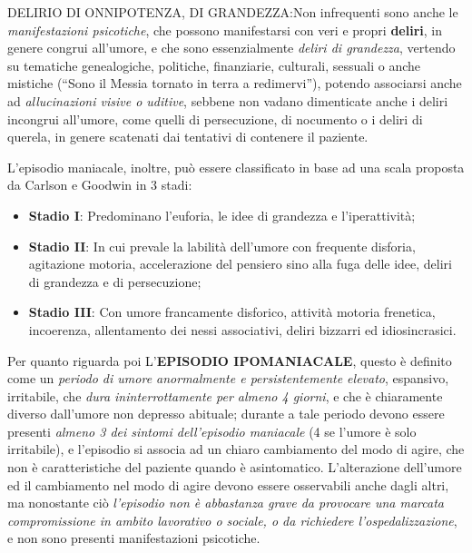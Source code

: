 \begin{itemize}
DELIRIO DI ONNIPOTENZA, DI GRANDEZZA:Non infrequenti sono anche le
\emph{manifestazioni psicotiche}, che possono manifestarsi con veri e
propri \textbf{deliri}, in genere congrui all'umore, e che sono
essenzialmente \emph{deliri di grandezza}, vertendo su tematiche
genealogiche, politiche, finanziarie, culturali, sessuali o anche
mistiche (``Sono il Messia tornato in terra a redimervi''), potendo
associarsi anche ad \emph{allucinazioni visive o uditive}, sebbene non
vadano dimenticate anche i deliri incongrui all'umore, come quelli di
persecuzione, di nocumento o i deliri di querela, in genere scatenati
dai tentativi di contenere il paziente.

L'episodio maniacale, inoltre, può essere classificato in base ad una
scala proposta da Carlson e Goodwin in 3 stadi:

\begin{itemize}
\item \textbf{Stadio I}: Predominano l'euforia, le idee di grandezza e l'iperattività;

\item \textbf{Stadio II}: In cui prevale la labilità dell'umore con frequente
disforia, agitazione motoria, accelerazione del pensiero sino alla fuga
delle idee, deliri di grandezza e di persecuzione;

\item \textbf{Stadio III}: Con umore francamente disforico, attività motoria
frenetica, incoerenza, allentamento dei nessi associativi, deliri
bizzarri ed idiosincrasici.
\end{itemize}

  Per quanto riguarda poi L'\textbf{EPISODIO IPOMANIACALE}, questo è
  definito come un \emph{periodo di umore anormalmente e
  persistentemente elevato}, espansivo, irritabile, che \emph{dura
  ininterrottamente per almeno 4 giorni}, e che è chiaramente diverso
  dall'umore non depresso abituale; durante a tale periodo devono essere
  presenti \emph{almeno 3 dei sintomi dell'episodio maniacale} (4 se
  l'umore è solo irritabile), e l'episodio si associa ad un chiaro
  cambiamento del modo di agire, che non è caratteristiche del paziente
  quando è asintomatico. L'alterazione dell'umore ed il cambiamento nel
  modo di agire devono essere osservabili anche dagli altri, ma
  nonostante ciò \emph{l'episodio non è abbastanza grave da provocare
  una marcata compromissione in ambito lavorativo o sociale, o da
  richiedere l'ospedalizzazione}, e non sono presenti manifestazioni
  psicotiche.


\end{itemize}
